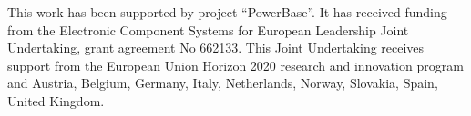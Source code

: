 This work has been supported by project ``PowerBase''. It has received funding from the Electronic Component Systems for European Leadership Joint Undertaking, grant agreement No 662133. This Joint Undertaking receives support from the European Union Horizon 2020 research and innovation program and Austria, Belgium, Germany, Italy, Netherlands, Norway, Slovakia, Spain, United Kingdom.
